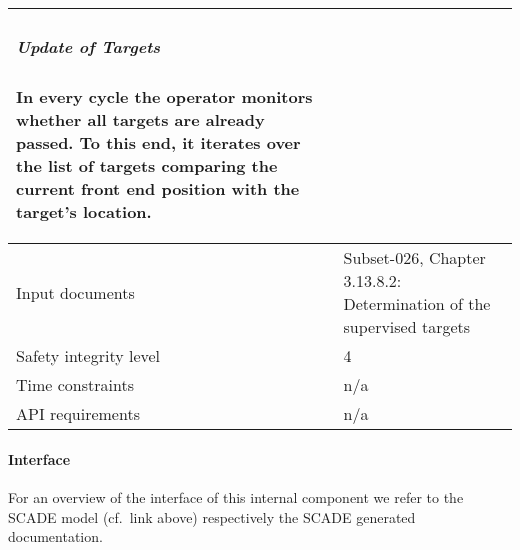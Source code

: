 \begin{longtable}{p{}p{}}
\subparagraph*{Update of Targets}
In every cycle the operator monitors whether all targets are already passed. To this end, it iterates over the list of targets comparing the current front end position with the target's location. \\
\midrule
Input documents	& 
Subset-026, Chapter 3.13.8.2: Determination of the supervised targets \\
\midrule
Safety integrity level		& 4 \\
\midrule
Time constraints		& n/a \\
\midrule
API requirements 		& n/a \\
\bottomrule
\end{longtable}


\paragraph{Interface}

For an overview of the interface of this internal component we refer to the SCADE model (cf.~link above) respectively the SCADE generated documentation.